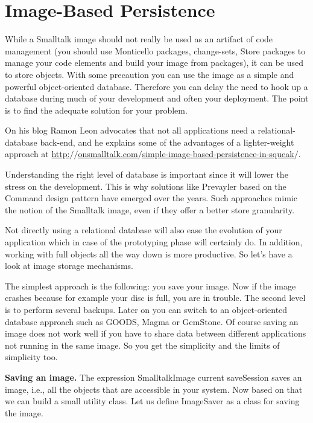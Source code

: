 \documentclass[a4paper,10pt,twoside]{book}
\newcommand{\ct}[1]{{\small\ttfamily\textup{#1}}}
\begin{document}
\section{Image-Based Persistence}
\label{book:advanced:persistency:imagebasedpersistency}

While a Smalltalk image should not really be used as an artifact of code management (you should use Monticello packages, change-sets, Store packages to manage your code elements and build your image from packages), it can be used to store objects. With some precaution you can use the image as a simple and powerful object-oriented database. Therefore you can delay the need to hook up a database during much of your development and often your deployment. The point is to find the adequate solution for your problem.

On his blog Ramon Leon advocates that not all applications need a relational-database back-end, and he explains some of the advantages of a lighter-weight approach at \href{http://onsmalltalk.com/simple-image-based-persistence-in-squeak/}{http:$/$$/$onsmalltalk.com$/$simple-image-based-persistence-in-squeak$/$}.

Understanding the right level of database is important since it will lower the stress on the development. This is why solutions like Prevayler based on the Command design pattern have emerged over the years. Such approaches mimic the notion of the Smalltalk image, even if they offer a better store granularity.

Not directly using a relational database will also ease the evolution of your application which in case of the prototyping phase will certainly do. In addition, working with full objects all the way down is more productive. So let's have a look at image storage mechanisms.

The simplest approach is the following: you save your image. Now if the image crashes because for example your disc is full, you are in trouble. The second level is to perform several backups. Later on you can switch to an object-oriented database approach such as GOODS, Magma or GemStone. Of course saving an image does not work well if you have to share data between different applications not running in the same image. So you get the simplicity and the limits of simplicity too.

\textbf{Saving an image.} The expression \ct{SmalltalkImage current saveSession} saves an image, i.e., all the objects that are accessible in your system. Now based on that we can build a small utility class. Let us define \ct{ImageSaver} as a class for saving the image.
\end{document}
